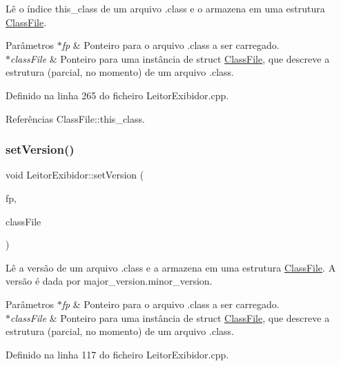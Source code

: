 Lê o índice this\+\_\+class de um arquivo .class e o armazena em uma estrutura \hyperlink{classClassFile}{Class\+File}. 
\begin{DoxyParams}{Parâmetros}
{\em $\ast$fp} & Ponteiro para o arquivo .class a ser carregado. \\
\hline
{\em $\ast$class\+File} & Ponteiro para uma instância de struct \hyperlink{classClassFile}{Class\+File}, que descreve a estrutura (parcial, no momento) de um arquivo .class. \\
\hline
\end{DoxyParams}


Definido na linha 265 do ficheiro Leitor\+Exibidor.\+cpp.



Referências Class\+File\+::this\+\_\+class.

\mbox{\label{classLeitorExibidor_a9a11956018816200897ca137c027cbf1}} 
\subsubsection{\texorpdfstring{set\+Version()}{setVersion()}}
{\footnotesize\ttfamily void Leitor\+Exibidor\+::set\+Version (\begin{DoxyParamCaption}\item[{F\+I\+LE $\ast$}]{fp,  }\item[{\hyperlink{classClassFile}{Class\+File} $\ast$}]{class\+File }\end{DoxyParamCaption})\hspace{0.3cm}{\ttfamily [private]}}

Lê a versão de um arquivo .class e a armazena em uma estrutura \hyperlink{classClassFile}{Class\+File}. A versão é dada por major\+\_\+version.\+minor\+\_\+version. 
\begin{DoxyParams}{Parâmetros}
{\em $\ast$fp} & Ponteiro para o arquivo .class a ser carregado. \\
\hline
{\em $\ast$class\+File} & Ponteiro para uma instância de struct \hyperlink{classClassFile}{Class\+File}, que descreve a estrutura (parcial, no momento) de um arquivo .class. \\
\hline
\end{DoxyParams}


Definido na linha 117 do ficheiro Leitor\+Exibidor.\+cpp.



